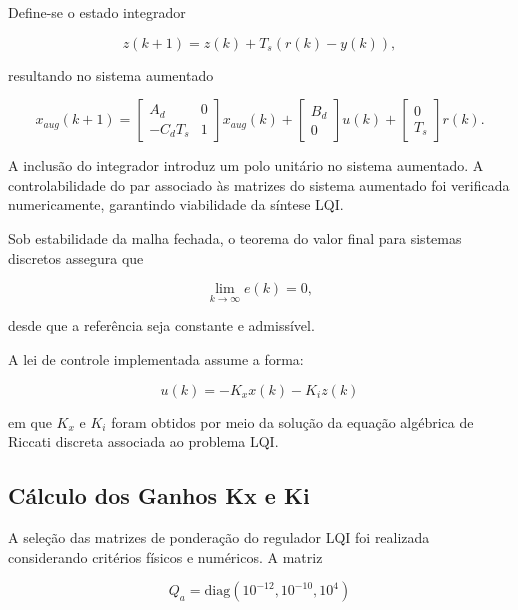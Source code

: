 Define-se o estado integrador

\begin{equation}
z(k+1) = z(k) + T_s (r(k) - y(k)),
\end{equation}

resultando no sistema aumentado

\begin{equation}
x_{aug}(k+1) =
\begin{bmatrix}
A_d & 0 \\
- C_d T_s & 1
\end{bmatrix}
x_{aug}(k)
+
\begin{bmatrix}
B_d \\
0
\end{bmatrix}
u(k)
+
\begin{bmatrix}
0 \\
T_s
\end{bmatrix}
r(k).
\end{equation}

A inclusão do integrador introduz um polo unitário no sistema aumentado. A controlabilidade do par associado às matrizes do sistema aumentado foi verificada numericamente, garantindo viabilidade da síntese LQI.

Sob estabilidade da malha fechada, o teorema do valor final para sistemas discretos assegura que

\begin{equation}
\lim_{k \to \infty} e(k) = 0,
\end{equation}

desde que a referência seja constante e admissível.

A lei de controle implementada assume a forma:

\begin{equation}
u(k) = -K_x x(k) - K_i z(k)
\end{equation}

em que $K_x$ e $K_i$ foram obtidos por meio da solução da equação algébrica de Riccati discreta associada ao problema LQI.

\subsection{Cálculo dos Ganhos Kx e Ki}

A seleção das matrizes de ponderação do regulador LQI foi realizada considerando critérios físicos e numéricos. A matriz

\begin{equation}
Q_a = \mathrm{diag}(10^{-12}, 10^{-10}, 10^{4})
\end{equation}


